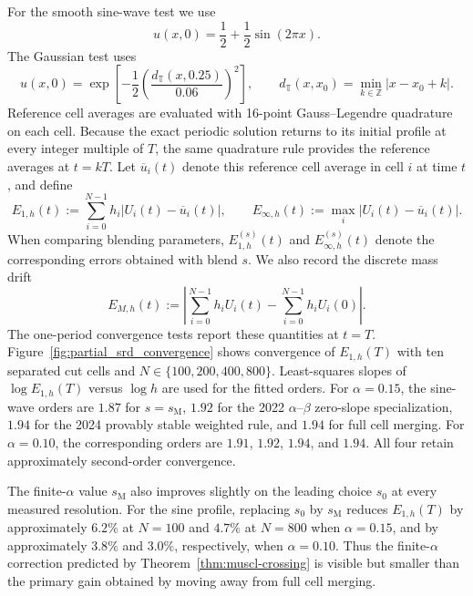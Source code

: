 \documentclass[preprint,12pt]{elsarticle}
\begin{document}
For the smooth sine-wave test we use
\[
    u(x,0)=\frac12+\frac12\sin(2\pi x).
\]
The Gaussian test uses
\[
    u(x,0)=\exp\!\left[-\frac12
    \left(\frac{d_{\mathbb T}(x,0.25)}{0.06}\right)^2\right],
    \qquad
    d_{\mathbb T}(x,x_0)=\min_{k\in\mathbb Z}|x-x_0+k|.
\]
Reference cell averages are evaluated with 16-point Gauss--Legendre
quadrature on each cell.  Because the exact periodic solution returns to its
initial profile at every integer multiple of $T$, the same quadrature rule
provides the reference averages at $t=kT$.  Let $\overline u_i(t)$ denote this
reference cell average in cell $i$ at time $t$, and define
\begin{equation}
    E_{1,h}(t):=\sum_{i=0}^{N-1} h_i
    \left|U_i(t)-\overline u_i(t)\right|,
    \qquad
    E_{\infty,h}(t):=\max_i
    \left|U_i(t)-\overline u_i(t)\right|.
    \label{eq:benchmark-errors}
\end{equation}
When comparing blending parameters, $E_{1,h}^{(s)}(t)$ and
$E_{\infty,h}^{(s)}(t)$ denote the corresponding errors obtained with blend
$s$.  We also record the discrete mass drift
\begin{equation}
    E_{M,h}(t):=
    \left|\sum_{i=0}^{N-1} h_i U_i(t)
    -\sum_{i=0}^{N-1} h_i U_i(0)\right|.
    \label{eq:mass-drift}
\end{equation}
The one-period convergence tests report these quantities at $t=T$.
Figure~\ref{fig:partial_srd_convergence} shows convergence of
$E_{1,h}(T)$ with ten separated cut cells and
$N\in\{100,200,400,800\}$.  Least-squares slopes of
$\log E_{1,h}(T)$ versus $\log h$ are used for the fitted orders.
For $\alpha=0.15$, the sine-wave orders are $1.87$ for
$s=s_{\mathrm M}$, $1.92$ for the 2022 $\alpha$--$\beta$ zero-slope specialization, $1.94$ for the 2024 provably stable weighted rule, and $1.94$ for full cell merging.
For $\alpha=0.10$, the corresponding orders are $1.91$, $1.92$, $1.94$, and $1.94$.  All four retain approximately second-order convergence.

The finite-$\alpha$ value $s_{\mathrm M}$ also improves slightly on the leading
choice $s_0$ at every measured resolution.  For the sine profile, replacing
$s_0$ by $s_{\mathrm M}$ reduces $E_{1,h}(T)$ by approximately $6.2\%$
at $N=100$ and $4.7\%$ at $N=800$ when $\alpha=0.15$, and by
approximately $3.8\%$ and $3.0\%$, respectively, when $\alpha=0.10$.
Thus the finite-$\alpha$ correction predicted by
Theorem~\ref{thm:muscl-crossing} is visible but smaller than the primary
gain obtained by moving away from full cell merging.
\end{document}
